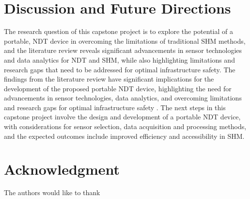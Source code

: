 \documentclass[journal, a4paper]{IEEEtran}
\begin{document}
\section{Discussion and Future Directions}  %
The research question of this capstone project is to explore the potential of a portable,
NDT device in overcoming the limitations of traditional SHM methods,
and the literature review reveals significant advancements in sensor technologies and data analytics for NDT and SHM,
while also highlighting limitations and research gaps that need to be addressed for optimal infrastructure safety.
The findings from the literature review have significant implications for the development of the
proposed portable NDT device, highlighting the need for advancements in sensor technologies,
data analytics, and overcoming limitations and research gaps for optimal infrastructure safety \cite{Udell2018} \cite{Meier2018}.
The next steps in this capstone project involve the design and development of a portable
NDT device, with considerations for sensor selection, data acquisition and processing methods,
and the expected outcomes include improved efficiency and accessibility in SHM.





\section*{Acknowledgment}
The authors would like to thank \lipsum[1]



\ifCLASSOPTIONcaptionsoff
  \newpage
\fi






\end{document}
